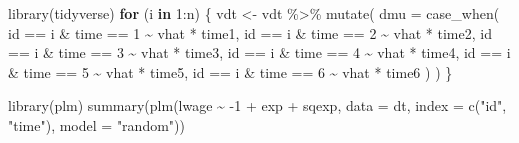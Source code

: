 \documentclass[
  12pt,
]{article}
\newenvironment{Shaded}{\begin{snugshade}}{\end{snugshade}}
\newcommand{\AttributeTok}[1]{\textcolor[rgb]{0.77,0.63,0.00}{#1}}
\newcommand{\ControlFlowTok}[1]{\textcolor[rgb]{0.13,0.29,0.53}{\textbf{#1}}}
\newcommand{\DecValTok}[1]{\textcolor[rgb]{0.00,0.00,0.81}{#1}}
\newcommand{\FunctionTok}[1]{\textcolor[rgb]{0.00,0.00,0.00}{#1}}
\newcommand{\NormalTok}[1]{#1}
\newcommand{\OtherTok}[1]{\textcolor[rgb]{0.56,0.35,0.01}{#1}}
\newcommand{\SpecialCharTok}[1]{\textcolor[rgb]{0.00,0.00,0.00}{#1}}
\newcommand{\StringTok}[1]{\textcolor[rgb]{0.31,0.60,0.02}{#1}}
\begin{document}
\begin{Shaded}
\begin{Highlighting}[]
\FunctionTok{library}\NormalTok{(tidyverse)}
\ControlFlowTok{for}\NormalTok{ (i }\ControlFlowTok{in} \DecValTok{1}\SpecialCharTok{:}\NormalTok{n) \{}
\NormalTok{  vdt }\OtherTok{\textless{}{-}}\NormalTok{ vdt }\SpecialCharTok{\%\textgreater{}\%} 
    \FunctionTok{mutate}\NormalTok{(}
      \AttributeTok{dmu =} \FunctionTok{case\_when}\NormalTok{(}
\NormalTok{        id }\SpecialCharTok{==}\NormalTok{ i }\SpecialCharTok{\&}\NormalTok{ time }\SpecialCharTok{==} \DecValTok{1} \SpecialCharTok{\textasciitilde{}}\NormalTok{ vhat }\SpecialCharTok{*}\NormalTok{ time1,}
\NormalTok{        id }\SpecialCharTok{==}\NormalTok{ i }\SpecialCharTok{\&}\NormalTok{ time }\SpecialCharTok{==} \DecValTok{2} \SpecialCharTok{\textasciitilde{}}\NormalTok{ vhat }\SpecialCharTok{*}\NormalTok{ time2,}
\NormalTok{        id }\SpecialCharTok{==}\NormalTok{ i }\SpecialCharTok{\&}\NormalTok{ time }\SpecialCharTok{==} \DecValTok{3} \SpecialCharTok{\textasciitilde{}}\NormalTok{ vhat }\SpecialCharTok{*}\NormalTok{ time3,}
\NormalTok{        id }\SpecialCharTok{==}\NormalTok{ i }\SpecialCharTok{\&}\NormalTok{ time }\SpecialCharTok{==} \DecValTok{4} \SpecialCharTok{\textasciitilde{}}\NormalTok{ vhat }\SpecialCharTok{*}\NormalTok{ time4,}
\NormalTok{        id }\SpecialCharTok{==}\NormalTok{ i }\SpecialCharTok{\&}\NormalTok{ time }\SpecialCharTok{==} \DecValTok{5} \SpecialCharTok{\textasciitilde{}}\NormalTok{ vhat }\SpecialCharTok{*}\NormalTok{ time5,}
\NormalTok{        id }\SpecialCharTok{==}\NormalTok{ i }\SpecialCharTok{\&}\NormalTok{ time }\SpecialCharTok{==} \DecValTok{6} \SpecialCharTok{\textasciitilde{}}\NormalTok{ vhat }\SpecialCharTok{*}\NormalTok{ time6}
\NormalTok{      )}
\NormalTok{    )}
\NormalTok{\}}
\end{Highlighting}
\end{Shaded}

\begin{Shaded}
\begin{Highlighting}[]
\FunctionTok{library}\NormalTok{(plm)}
\FunctionTok{summary}\NormalTok{(}\FunctionTok{plm}\NormalTok{(lwage }\SpecialCharTok{\textasciitilde{}} \SpecialCharTok{{-}}\DecValTok{1} \SpecialCharTok{+}\NormalTok{ exp }\SpecialCharTok{+}\NormalTok{ sqexp, }\AttributeTok{data =}\NormalTok{ dt, }\AttributeTok{index =} \FunctionTok{c}\NormalTok{(}\StringTok{"id"}\NormalTok{, }\StringTok{"time"}\NormalTok{), }\AttributeTok{model =} \StringTok{"random"}\NormalTok{))}
\end{Highlighting}
\end{Shaded}
\end{document}
